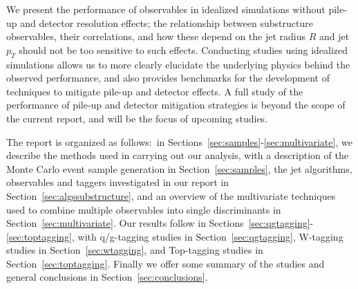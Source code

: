 
We present the performance of observables in idealized simulations without pile-up and detector resolution effects;
the relationship between substructure observables, their correlations, and how these depend on the jet radius $R$ and jet $p_T$ should not be too sensitive to such effects. Conducting  studies using idealized simulations allows us to more clearly elucidate the underlying physics behind the observed performance, and also provides benchmarks for the development of techniques to mitigate pile-up and detector effects. A full study of the performance of pile-up and detector mitigation strategies is beyond the scope of the current report, and will be the focus of upcoming studies.

The report is organized as follows:~in Sections~\ref{sec:samples}-\ref{sec:multivariate}, we describe the methods used in carrying out our analysis, with a description of the Monte Carlo event sample generation in Section~\ref{sec:samples}, the jet algorithms, observables and taggers investigated in our report in Section~\ref{sec:algssubstructure}, and an overview of the multivariate techniques used to combine multiple observables into single discriminants in Section~\ref{sec:multivariate}. Our results follow in Sections~\ref{sec:qgtagging}-\ref{sec:toptagging}, with q/g-tagging studies in Section~\ref{sec:qgtagging}, W-tagging studies in Section~\ref{sec:wtagging}, and Top-tagging studies in Section~\ref{sec:toptagging}. Finally we offer some summary of the studies and general conclusions in Section~\ref{sec:conclusions}.\\


